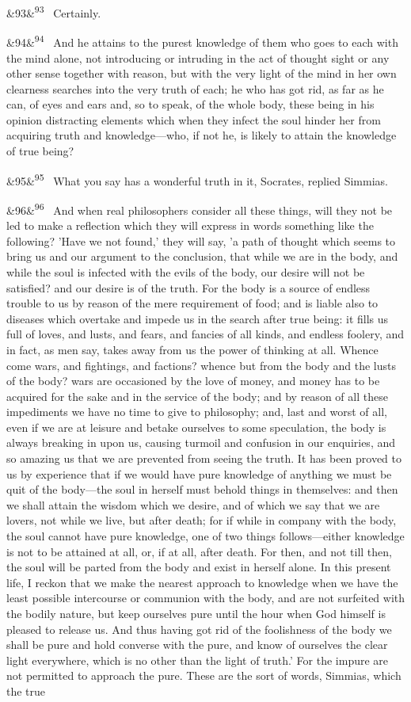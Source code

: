 \documentclass[12pt]{article}
\newcommand{\para}[1][]{\par\noindent\ifx&#1&\else\textsuperscript{\footnotesize #1}~\fi}
\begin{document}
\para[93] Certainly.

\para[94] And he attains to the purest knowledge of them who goes to each with the mind alone, not introducing or intruding in the act of thought sight or any other sense together with reason, but with the very light of the mind in her own clearness searches into the very truth of each; he who has got rid, as far as he can, of eyes and ears and, so to speak, of the whole body, these being in his opinion distracting elements which when they infect the soul hinder her from acquiring truth and knowledge---who, if not he, is likely to attain the knowledge of true being?

\para[95] What you say has a wonderful truth in it, Socrates, replied Simmias.

\para[96] And when real philosophers consider all these things, will they not be led to make a reflection which they will express in words something like the following? 'Have we not found,' they will say, 'a path of thought which seems to bring us and our argument to the conclusion, that while we are in the body, and while the soul is infected with the evils of the body, our desire will not be satisfied? and our desire is of the truth. For the body is a source of endless trouble to us by reason of the mere requirement of food; and is liable also to diseases which overtake and impede us in the search after true being: it fills us full of loves, and lusts, and fears, and fancies of all kinds, and endless foolery, and in fact, as men say, takes away from us the power of thinking at all. Whence come wars, and fightings, and factions? whence but from the body and the lusts of the body? wars are occasioned by the love of money, and money has to be acquired for the sake and in the service of the body; and by reason of all these impediments we have no time to give to philosophy; and, last and worst of all, even if we are at leisure and betake ourselves to some speculation, the body is always breaking in upon us, causing turmoil and confusion in our enquiries, and so amazing us that we are prevented from seeing the truth. It has been proved to us by experience that if we would have pure knowledge of anything we must be quit of the body---the soul in herself must behold things in themselves: and then we shall attain the wisdom which we desire, and of which we say that we are lovers, not while we live, but after death; for if while in company with the body, the soul cannot have pure knowledge, one of two things follows---either knowledge is not to be attained at all, or, if at all, after death. For then, and not till then, the soul will be parted from the body and exist in herself alone. In this present life, I reckon that we make the nearest approach to knowledge when we have the least possible intercourse or communion with the body, and are not surfeited with the bodily nature, but keep ourselves pure until the hour when God himself is pleased to release us. And thus having got rid of the foolishness of the body we shall be pure and hold converse with the pure, and know of ourselves the clear light everywhere, which is no other than the light of truth.' For the impure are not permitted to approach the pure. These are the sort of words, Simmias, which the true 
\end{document}
